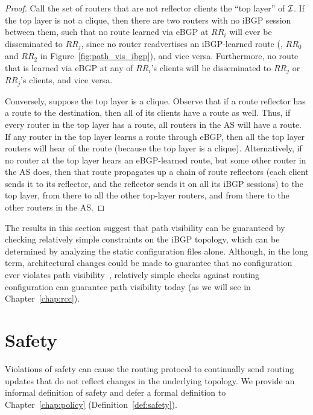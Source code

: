 \begin{proof}
Call the set of routers that are not reflector clients the ``top layer''
of $\mathcal{I}$.  If the top layer is not a clique, then there are two routers
with no iBGP session between them, such that no route learned via eBGP
at $RR_i$ will ever be disseminated to $RR_j$, since no router
readvertises an iBGP-learned route (\eg, $RR_0$ and $RR_2$ in
Figure~\ref{fig:path_vis_ibgp}), and vice versa.  Furthermore, no route that
is learned via eBGP at any of $RR_i$'s clients will be disseminated to
$RR_j$ or $RR_j$'s clients, and vice versa.

Conversely, suppose the top layer is a clique. Observe that if a route
reflector has a route to the destination, then all of its clients have a
route as well.  Thus, if every router in the top layer has a route, all
routers in the AS will have a route.  If any router in the top layer
learns a route through eBGP, then all the top layer routers will hear of
the route (because the top layer is a clique).  Alternatively, if no
router at the top layer hears an eBGP-learned route, but some other
router in the AS does, then that route propagates up a chain of route
reflectors (each client sends it to its reflector, and the reflector
sends it on all its iBGP sessions) to the top layer, from there to all
the other top-layer routers, and from there to the other routers in the
AS.
\end{proof}

The results in this section suggest that path visibility can be
guaranteed by checking relatively simple constraints on the iBGP
topology, which can be determined by analyzing the static configuration
files alone.  Although, in the long term, architectural changes could be
made to guarantee that no configuration ever violates path
visibility~\cite{id-versatile-rr, caesar2004, feamster:fdna2004},
relatively simple checks against routing configuration can guarantee
path visibility today (as we will see in Chapter~\ref{chap:rcc}). 



\section{Safety}\label{sec:safety_def}

Violations of safety can cause the routing protocol
to continually send routing updates that do not reflect changes in the
underlying topology.  We provide an informal definition of
safety and defer a formal definition to Chapter~\ref{chap:policy}
(Definition~\ref{def:safety}).

